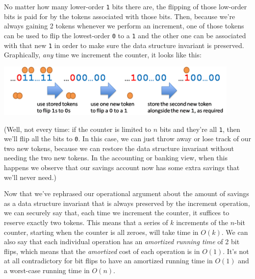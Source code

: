 No matter how many lower-order \lstinline'1' bits there are, the
flipping of those low-order bits is paid for by the tokens associated
with those bits.  Then, because we're always gaining 2 tokens whenever
we perform an increment, one of those tokens can be used to flip the
lowest-order \lstinline'0' to a \lstinline'1' and the other one can be
associated with that new \lstinline'1' in order to make sure the data
structure invariant is preserved. Graphically, \emph{any} time we
increment the counter, it looks like this:
\begin{center}
\includegraphics[width=0.9\textwidth]{img/bincount4.png}
\end{center}
(Well, not every time: if the counter is limited to $n$ bits and
they're all \lstinline'1', then we'll flip all the bits to
\lstinline'0'. In this case, we can just throw away or lose track of
our two new tokens, because we can restore the data structure
invariant without needing the two new tokens. In the accounting or
banking view, when this happens we observe that our savings account
now has some extra savings that we'll never need.)

Now that we've rephrased our operational argument about the amount of
savings as a data structure invariant that is always preserved by the
increment operation, we can securely say that, each time we increment
the counter, it suffices to reserve exactly two tokens. This means
that a series of $k$ increments of the $n$-bit counter, starting when
the counter is all zeroes, will take time in $O(k)$. We can also say
that each individual operation has an \emph{amortized running time} of
2 bit flips, which means that the \emph{amortized} cost of each
operation is in $O(1)$. It's not at all contradictory for bit flips to
have an amortized running time in $O(1)$ and a worst-case running time
in $O(n)$.

